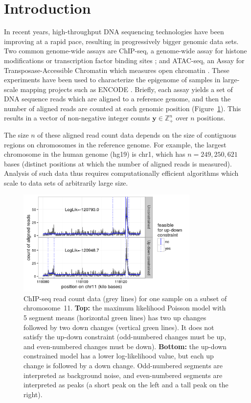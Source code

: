\documentclass[twoside,11pt]{article}
\newcommand{\ZZ}{\mathbb Z}
\begin{document}
\section{Introduction}

In recent years, high-throughput DNA sequencing technologies have been
improving at a rapid pace, resulting in progressively bigger genomic
data sets. Two common genome-wide assays are ChIP-seq, a genome-wide
assay for histone modifications or transcription factor binding sites
\citep{chip-seq}; and ATAC-seq, an Assay for Transposase-Accessible
Chromatin which measures open chromatin \citep{ATACseq}. These
experiments have been used to characterize the epigenome of samples in
large-scale mapping projects such as ENCODE \citep{ENCODE}. Briefly, each
assay yields a set of DNA sequence reads which are aligned to a
reference genome, and then the number of aligned reads are counted at
each genomic position (Figure~\ref{fig:data-models}). This results in
a vector of non-negative integer counts $\mathbf y\in\ZZ_+^n$ over $n$
positions.

The size $n$ of these aligned read count data depends on the size of contiguous regions on chromosomes in the reference genome. For example, the largest
chromosome in the human genome (hg19) is chr1, which has $n=249,250,621$
bases (distinct positions at which the number of aligned reads is
measured). Analysis of such data thus requires computationally
efficient algorithms which scale to data sets of arbitrarily large
size.

\begin{figure}[t!]
  \centering
  \includegraphics[width=0.8\textwidth]{figure-data-models}
  \vskip -0.5cm
  \caption{ChIP-seq read count data (grey lines) for one sample on a
    subset of chromosome~11. \textbf{Top:} the maximum likelihood
    Poisson model with 5 segment means (horizontal green lines) has
    two up changes followed by two down changes (vertical green
    lines). It does not satisfy the up-down constraint (odd-numbered
    changes must be up, and even-numbered changes must be
    down). \textbf{Bottom:} the up-down constrained model has a lower
    log-likelihood value, but each up change is followed by a down
    change. Odd-numbered segments are interpreted as background noise,
    and even-numbered segments are interpreted as peaks (a short peak
    on the left and a tall peak on the right).}
  \label{fig:data-models}
\end{figure}
\end{document}

